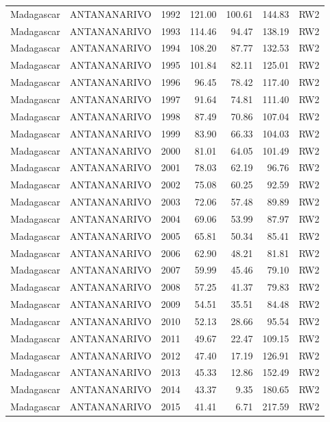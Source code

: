 \begin{longtable}{lllrrrl}
  Madagascar & ANTANANARIVO & 1992 & 121.00 & 100.61 & 144.83 & RW2 \\ 
  Madagascar & ANTANANARIVO & 1993 & 114.46 & 94.47 & 138.19 & RW2 \\ 
  Madagascar & ANTANANARIVO & 1994 & 108.20 & 87.77 & 132.53 & RW2 \\ 
  Madagascar & ANTANANARIVO & 1995 & 101.84 & 82.11 & 125.01 & RW2 \\ 
  Madagascar & ANTANANARIVO & 1996 & 96.45 & 78.42 & 117.40 & RW2 \\ 
  Madagascar & ANTANANARIVO & 1997 & 91.64 & 74.81 & 111.40 & RW2 \\ 
  Madagascar & ANTANANARIVO & 1998 & 87.49 & 70.86 & 107.04 & RW2 \\ 
  Madagascar & ANTANANARIVO & 1999 & 83.90 & 66.33 & 104.03 & RW2 \\ 
  Madagascar & ANTANANARIVO & 2000 & 81.01 & 64.05 & 101.49 & RW2 \\ 
  Madagascar & ANTANANARIVO & 2001 & 78.03 & 62.19 & 96.76 & RW2 \\ 
  Madagascar & ANTANANARIVO & 2002 & 75.08 & 60.25 & 92.59 & RW2 \\ 
  Madagascar & ANTANANARIVO & 2003 & 72.06 & 57.48 & 89.89 & RW2 \\ 
  Madagascar & ANTANANARIVO & 2004 & 69.06 & 53.99 & 87.97 & RW2 \\ 
  Madagascar & ANTANANARIVO & 2005 & 65.81 & 50.34 & 85.41 & RW2 \\ 
  Madagascar & ANTANANARIVO & 2006 & 62.90 & 48.21 & 81.81 & RW2 \\ 
  Madagascar & ANTANANARIVO & 2007 & 59.99 & 45.46 & 79.10 & RW2 \\ 
  Madagascar & ANTANANARIVO & 2008 & 57.25 & 41.37 & 79.83 & RW2 \\ 
  Madagascar & ANTANANARIVO & 2009 & 54.51 & 35.51 & 84.48 & RW2 \\ 
  Madagascar & ANTANANARIVO & 2010 & 52.13 & 28.66 & 95.54 & RW2 \\ 
  Madagascar & ANTANANARIVO & 2011 & 49.67 & 22.47 & 109.15 & RW2 \\ 
  Madagascar & ANTANANARIVO & 2012 & 47.40 & 17.19 & 126.91 & RW2 \\ 
  Madagascar & ANTANANARIVO & 2013 & 45.33 & 12.86 & 152.49 & RW2 \\ 
  Madagascar & ANTANANARIVO & 2014 & 43.37 & 9.35 & 180.65 & RW2 \\ 
  Madagascar & ANTANANARIVO & 2015 & 41.41 & 6.71 & 217.59 & RW2 \\ 

\end{longtable}

